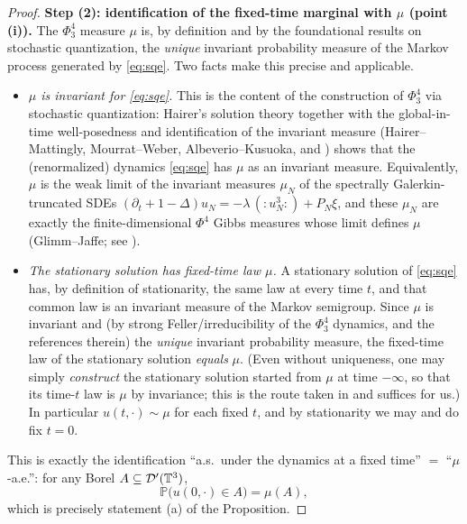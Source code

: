 \begin{proof}
\medskip
\textbf{Step (2): identification of the fixed-time marginal with $\mu$ (point (i)).}
The $\Phi^4_3$ measure $\mu$ is, by definition and by the foundational results on
stochastic quantization, the \emph{unique} invariant probability measure of the
Markov process generated by \eqref{eq:sqe}. Two facts make this precise and
applicable.
\begin{itemize}
\item[\rm($\alpha$)] \emph{$\mu$ is invariant for \eqref{eq:sqe}.} This is the
content of the construction of $\Phi^4_3$ via stochastic quantization: Hairer's
solution theory \cite{Hairer14} together with the global-in-time well-posedness and
identification of the invariant measure (Hairer--Mattingly, Mourrat--Weber,
Albeverio--Kusuoka, and \cite{EW24}) shows that the (renormalized) dynamics
\eqref{eq:sqe} has $\mu$ as an invariant measure. Equivalently, $\mu$ is the
weak limit of the invariant measures $\mu_N$ of the spectrally Galerkin-truncated
SDEs $(\partial_t+1-\Delta)u_N=-\lambda\,({:}u_N^3{:})+P_N\xi$, and these $\mu_N$ are
exactly the finite-dimensional $\Phi^4$ Gibbs measures whose limit defines $\mu$
(Glimm--Jaffe; see \cite{CC18,EW24}).
\item[\rm($\beta$)] \emph{The stationary solution has fixed-time law $\mu$.} A
stationary solution of \eqref{eq:sqe} has, by definition of stationarity, the same
law at every time $t$, and that common law is an invariant measure of the Markov
semigroup. Since $\mu$ is invariant and (by strong Feller/irreducibility of the
$\Phi^4_3$ dynamics, \cite{HM18} and the references therein) the \emph{unique}
invariant probability measure, the fixed-time law of the stationary solution
\emph{equals} $\mu$. (Even without uniqueness, one may simply \emph{construct} the
stationary solution started from $\mu$ at time $-\infty$, so that its time-$t$ law
is $\mu$ by invariance; this is the route taken in \cite{EW24} and suffices for
us.) In particular $u(t,\cdot)\sim\mu$ for each fixed $t$, and by stationarity we
may and do fix $t=0$.
\end{itemize}
This is exactly the identification ``a.s.\ under the dynamics at a fixed time''
$=$ ``$\mu$-a.e.'': for any Borel $A\subseteq\mathcal{D}'(\mathbb{T}^3)$,
\begin{equation}\label{eq:identif}
\mathbb P\bigl(u(0,\cdot)\in A\bigr)=\mu(A),
\end{equation}
which is precisely statement (a) of the Proposition.


\end{proof}
